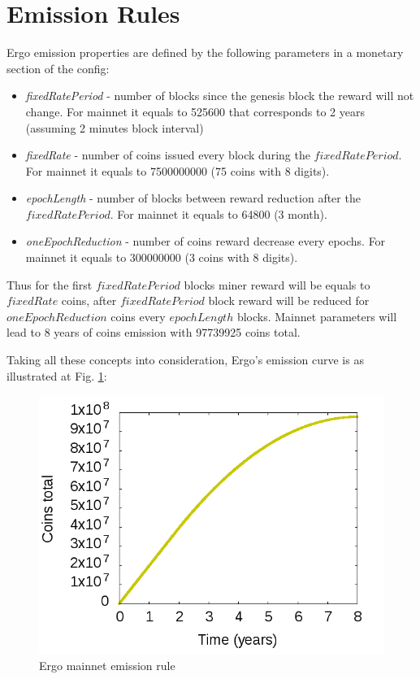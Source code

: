 \section{Emission Rules}
Ergo emission properties are defined by the following parameters in a monetary section of the config:

\begin{itemize}
    \item{\em fixedRatePeriod } - number of blocks since the genesis block the reward will not change.
    For mainnet it equals to 525600 that corresponds to 2 years (assuming 2 minutes block interval)
    \item{\em fixedRate } - number of coins issued every block during the $fixedRatePeriod$.
    For mainnet it equals to 7500000000 (75 coins with 8 digits).
    \item{\em epochLength } - number of blocks between reward reduction after the $fixedRatePeriod$.
    For mainnet it equals to 64800 (3 month).
    \item{\em oneEpochReduction } - number of coins reward decrease every epochs.
    For mainnet it equals to 300000000 (3 coins with 8 digits).
\end{itemize}

Thus for the first $fixedRatePeriod$ blocks miner reward will be equals to $fixedRate$ \ergo{} coins,
after $fixedRatePeriod$ block reward will be reduced for $oneEpochReduction$ coins every $epochLength$ blocks.
Mainnet parameters will lead to 8 years of coins emission with 97739925 coins total.

Taking all these concepts into consideration, Ergo's emission curve is as illustrated at Fig. \ref{fig:emission}:

\begin{figure}[H]
    \centering
    \begin{minipage}[b]{0.6\textwidth}
        \includegraphics[width=\textwidth]{img/EmissionCurve.png}
    \end{minipage}
    \caption{Ergo mainnet emission rule
    \label{fig:emission}}
\end{figure}


